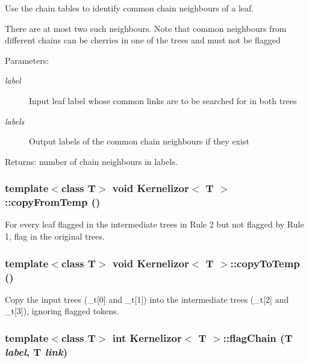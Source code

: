 Use the chain tables to identify common chain neighbours of a leaf. 

There are at most two such neighbours. Note that common neighbours from different chains can be cherries in one of the trees and must not be flagged \begin{Desc}
\item[Parameters:]
\begin{description}
\item[{\em label}]Input leaf label whose common links are to be searched for in both trees \item[{\em labels}]Output labels of the common chain neighbours if they exist \end{description}
\end{Desc}
\begin{Desc}
\item[Returns:]number of chain neighbours in labels. \end{Desc}
\subsubsection{\setlength{\rightskip}{0pt plus 5cm}template$<$class T$>$ void {\bf Kernelizor}$<$ T $>$::copy\-From\-Temp ()\hspace{0.3cm}{\tt  [protected]}}\label{classKernelizor_b6}


For every leaf flagged in the intermediate trees in Rule 2 but not flagged by Rule 1, flag in the original trees. 

\subsubsection{\setlength{\rightskip}{0pt plus 5cm}template$<$class T$>$ void {\bf Kernelizor}$<$ T $>$::copy\-To\-Temp ()\hspace{0.3cm}{\tt  [protected]}}\label{classKernelizor_b5}


Copy the input trees (\_\-t[0] and \_\-t[1]) into the intermediate trees (\_\-t[2] and \_\-t[3]), ignoring flagged tokens. 

\subsubsection{\setlength{\rightskip}{0pt plus 5cm}template$<$class T$>$ int {\bf Kernelizor}$<$ T $>$::flag\-Chain (T {\em label}, T {\em link})\hspace{0.3cm}{\tt  [protected]}}\label{classKernelizor_b4}


